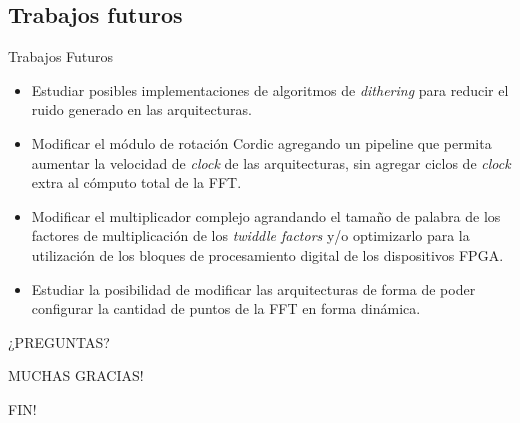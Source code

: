 \documentclass{bredelebeamer}
\newcommand\Fontit{\fontsize{9}{15}\selectfont}
\begin{document}
\subsection{Trabajos futuros}
\begin{frame}{Trabajos Futuros}
  \Fontit
  \begin{itemize}
	\item<1-> Estudiar posibles implementaciones de algoritmos de \textit{dithering} para
	reducir el ruido generado en las arquitecturas.
	\item<2-> Modificar el módulo de rotación Cordic agregando un pipeline que permita aumentar la
	velocidad de \textit{clock} de las arquitecturas, sin agregar ciclos de \textit{clock} extra al
	cómputo total de la FFT.
	\item<3-> Modificar el multiplicador complejo agrandando el tamaño de palabra de los factores de
	multiplicación de los \textit{twiddle factors} y/o optimizarlo para la utilización de los bloques
	de procesamiento digital de los dispositivos FPGA.
	\item<4-> Estudiar la posibilidad de modificar las arquitecturas de forma de poder configurar la
	cantidad de puntos de la FFT en forma dinámica.
 \end{itemize}
\end{frame}

\begin{frame}

\begin{center}
\Huge ¿PREGUNTAS?
\end{center}

\end{frame}

\begin{frame}

\begin{center}
\Huge MUCHAS GRACIAS!
\end{center}

\end{frame}

\begin{frame}

\begin{center}
\Huge FIN!
\end{center}

\end{frame}
\end{document}
